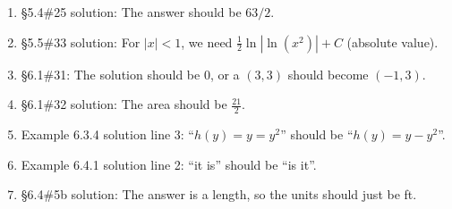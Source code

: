 \documentclass{amsart}
\newcommand{\abs}[1]{\left\lvert#1\right\rvert}
\begin{document}
\begin{enumerate}
\item \S5.4\#25 solution: The answer should be $63/2$.
\item \S5.5\#33 solution: For $\abs x<1$, we need $\frac12 \ln\abs{\ln \left(x^2\right)}+C$ (absolute value).
\item \S6.1\#31: The solution should be 0, or a $(3,3)$ should become $(-1,3)$.
\item \S6.1\#32 solution: The area should be $\frac{21}2$.
\item Example 6.3.4 solution line 3: ``$h(y)=y=y^2$'' should be ``$h(y)=y-y^2$''.
\item Example 6.4.1 solution line 2: ``it is'' should be ``is it''.
\item \S6.4\#5b solution: The answer is a length, so the units should just be ft.
\label{2018-07-13I}
\end{enumerate}\bigskip

\end{document}

